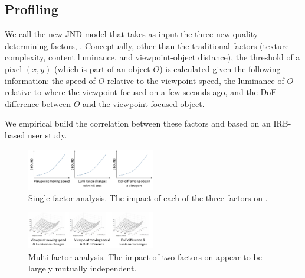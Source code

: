 \subsection{Profiling \vrjnd}
\label{subsec:jnd:details}

We call the new JND model that takes as input the three new quality-determining factors, \vrjnd.
Conceptually, other than the traditional factors (texture complexity, content luminance, and viewpoint-object distance), the \vrjnd threshold of a pixel $(x,y)$ (which is part of an object $O$) is calculated given the following information: the speed of $O$ relative to the viewpoint speed, the luminance of $O$ relative to where the viewpoint focused on a few seconds ago, and the DoF difference between $O$ and the viewpoint focused object. 


We empirical build the correlation between these factors and \vrjnd based on an IRB-based user study.


\begin{figure}
  \centering
  \includegraphics[width=0.5\textwidth]{figures/single-factor.pdf}
  \caption{Single-factor analysis. The impact of each of the three factors on \vrjnd.}
  \label{fig:single-factor}
 \end{figure}


\begin{figure}
  \centering
  \includegraphics[width=0.5\textwidth]{figures/two-factor.pdf}
  \caption{Multi-factor analysis. The impact of two factors on \vrjnd appear to be largely mutually independent.}
  \label{fig:two-factor}
 \end{figure}

